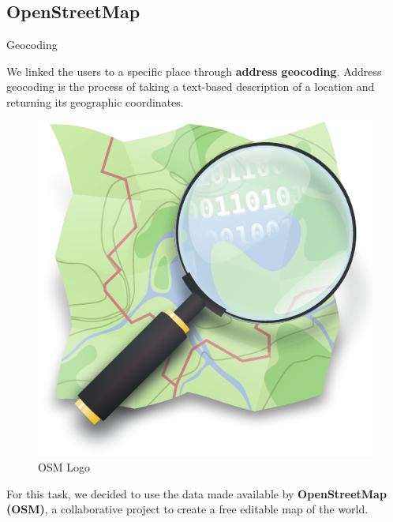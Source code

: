 \documentclass[8pt]{beamer}  %
\begin{document}
\subsection{OpenStreetMap}
\begin{frame}{Geocoding}

    We linked the users to a specific place through \textbf{address geocoding}. Address geocoding is the process of taking a text-based description of a location and returning its geographic coordinates.
    
    \begin{figure}
        \centering
        \includegraphics[scale=.25]{assets/img/Openstreetmap_logo.pdf}
        \caption{OSM Logo}
        \label{fig:osm_logo}
    \end{figure}
    
    For this task, we decided to use the data made available by \textbf{OpenStreetMap (OSM)}\autocite{OpenStreetMap}, a collaborative project to create a free editable map of the world.
    
\end{frame}
\end{document}
